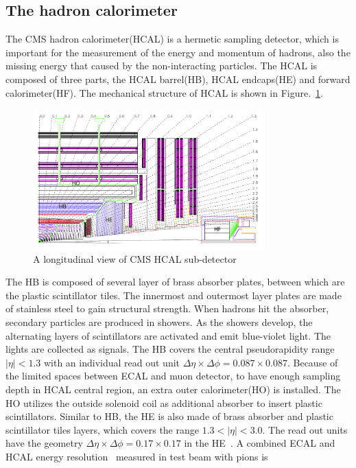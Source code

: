 \subsection{The hadron calorimeter}

The CMS hadron calorimeter(HCAL) is a hermetic sampling detector, which is important for the measurement of the energy and momentum of hadrons, also the missing energy that caused by the non-interacting particles.  The HCAL is composed of three parts, the HCAL barrel(HB), HCAL endcaps(HE) and forward calorimeter(HF). The mechanical structure of HCAL is shown in Figure.~\ref{fig:HCALL_sketch}. 

\begin{figure}[htbp] 
\centering
\includegraphics[width=0.8\textwidth]{chapter3/HCAL_sketch.png}
\caption{A longitudinal view of CMS HCAL sub-detector~\cite{CMS_experiment}}
\label{fig:HCALL_sketch}
\end{figure}


The HB is composed of  several layer of brass absorber plates, between which are the plastic scintillator tiles. The innermost and outermost layer plates are made of stainless steel to gain structural strength. When hadrons hit the absorber, secondary particles are produced in showers. As the showers develop, the alternating layers of scintillators are activated and emit blue-violet light. The lights are collected as signals. The HB covers the central pseudorapidity range $|\eta|<1.3$ with an individual read out unit $\Delta \eta\times\Delta\phi=0.087\times 0.087$. Because of the limited spaces between ECAL and muon detector, to have enough sampling depth in HCAL central region, an extra outer calorimeter(HO) is installed. The HO utilizes the outside solenoid coil as additional absorber to insert plastic scintillators. Similar to HB, the HE is also made of brass absorber and plastic scintillator tiles layers, which covers the range $1.3<|\eta|<3.0$. The read out units have the geometry $\Delta \eta\times\Delta\phi=0.17\times 0.17$ in the HE~\cite{CMS_experiment}. A combined ECAL and HCAL energy resolution~\cite{HCAL_reso} measured in test beam with pions is 

